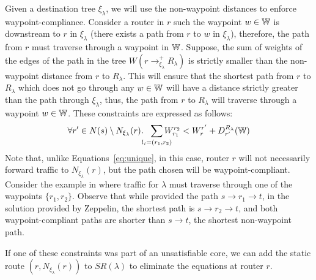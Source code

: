 Given a destination tree $\xi_\lambda$, we will use the 
non-waypoint distances to enforce waypoint-compliance. Consider a 
router in $r$ such the waypoint $w \in \mathbb{W}$ is downstream to $r$ in $\xi_\lambda$
(there exists a path from $r$ to $w$ in $\xi_\lambda$), therefore,
the path from $r$ must traverse through 
a waypoint in $\mathbb{W}$.  
Suppose, the sum of weights of the edges of
the path in the tree $W(r \rightarrow^+_{\xi_\lambda} R_\lambda)$  
is strictly smaller than the non-waypoint 
distance from $r$ to $R_\lambda$. This will ensure that 
the shortest path from $r$ to $R_\lambda$ which does not go through
any $w \in \mathbb{W}$ will have a distance strictly greater than the path through
$\xi_\lambda$, thus, the path from $r$ to $R_\lambda$ will traverse
through a waypoint $w \in \mathbb{W}$. These constraints are expressed as follows:
\begin{equation} \label{eq:waypoint}
\forall r' \in N(s) \setminus N_{\xi_\lambda}(r).~~ \sum_{\mathclap{\substack{l_i=(r_1,r_2)}}} 
W_{r_1}^{r_2} < 
W_{r}^{r'}+ D_{r'}^{R_\lambda}(\waypt) 
\end{equation}
Note that, unlike Equations~\ref{eq:unique}, in this case, 
router $r$ will not necessarily forward traffic to  
$N_{\xi_\lambda}(r)$, but the path chosen will be waypoint-compliant. 
Consider the example in  where traffic for
$\lambda$ must traverse through one of the waypoints $\{r_1, r_2\}$. 
Observe that while \genesis provided the path $s \rightarrow 
r_1 \rightarrow t$, in the solution provided by Zeppelin, 
the shortest path is $s \rightarrow r_2
\rightarrow t$, and both waypoint-compliant paths are shorter 
than $s \rightarrow t$, the shortest non-waypoint path.

If one of these constraints was part of an unsatisfiable  
core, we can add the static route $(r, N_{\xi_\lambda}(r))$ to
$SR(\lambda)$ to eliminate the equations at router $r$. 


